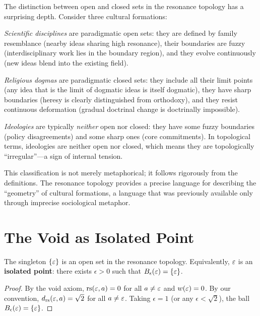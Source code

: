 \begin{remark}
The distinction between open and closed sets in the resonance topology
has a surprising depth.  Consider three cultural formations:

\emph{Scientific disciplines} are paradigmatic open sets: they are
defined by family resemblance (nearby ideas sharing high resonance),
their boundaries are fuzzy (interdisciplinary work lies in the boundary
region), and they evolve continuously (new ideas blend into the existing
field).

\emph{Religious dogmas} are paradigmatic closed sets: they include all
their limit points (any idea that is the limit of dogmatic ideas is
itself dogmatic), they have sharp boundaries (heresy is clearly
distinguished from orthodoxy), and they resist continuous deformation
(gradual doctrinal change is doctrinally impossible).

\emph{Ideologies} are typically \emph{neither} open nor closed: they
have some fuzzy boundaries (policy disagreements) and some sharp ones
(core commitments).  In topological terms, ideologies are neither
open nor closed, which means they are topologically ``irregular''---a
sign of internal tension.

This classification is not merely metaphorical; it follows rigorously
from the definitions.  The resonance topology provides a precise
language for describing the ``geometry'' of cultural formations, a
language that was previously available only through imprecise sociological
metaphor.
\end{remark}

\section{The Void as Isolated Point}
\label{sec:void-isolated}

\begin{theorem}
\label{thm:void-isolated}
The singleton $\{\varepsilon\}$ is an open set in the resonance topology.
Equivalently, $\varepsilon$ is an \textbf{isolated point}: there exists
$\epsilon > 0$ such that $B_\epsilon(\varepsilon) = \{\varepsilon\}$.
\end{theorem}

\begin{proof}
By the void axiom, $\mathrm{rs}(\varepsilon, a) = 0$ for all $a \neq \varepsilon$
and $w(\varepsilon) = 0$.  By our convention, $d_{\mathrm{rs}}(\varepsilon, a) =
\sqrt{2}$ for all $a \neq \varepsilon$.  Taking $\epsilon = 1$
(or any $\epsilon < \sqrt{2}$), the ball $B_\epsilon(\varepsilon) =
\{\varepsilon\}$.
\end{proof}


